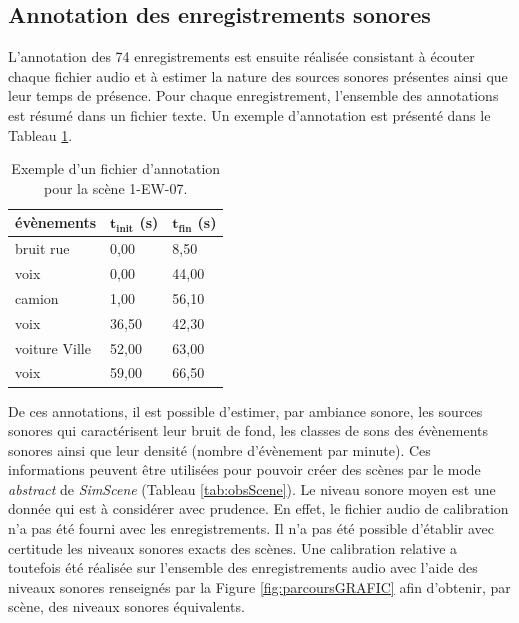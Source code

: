 \subsection{Annotation des enregistrements sonores}\label{part:scene_annotation}

L'annotation des 74 enregistrements est ensuite réalisée consistant à écouter chaque fichier audio et à estimer la nature des sources sonores présentes ainsi que leur temps de présence. Pour chaque enregistrement, l'ensemble des annotations est résumé dans un fichier texte. Un exemple d'annotation est présenté dans le Tableau \ref{tab:exemple_annotation}.\\

\begin{table}[h]
\caption{Exemple d'un fichier d'annotation pour la scène 1-EW-07.}
\centering
\begin{tabular}{lll}
\toprule
\textbf{évènements}    & $\mathbf{t_{init}}$ \textbf{(s)} & $\mathbf{t_{fin}}$ \textbf{(s)} \\ \midrule
bruit rue     & 0,00            & 8,50           \\
\rowcolor[HTML]{C0C0C0}
voix          & 0,00            & 44,00          \\
camion        & 1,00            & 56,10          \\
\rowcolor[HTML]{C0C0C0}
voix          & 36,50           & 42,30          \\
voiture Ville & 52,00          & 63,00          \\
\rowcolor[HTML]{C0C0C0}
voix          & 59,00           & 66,50         \\ \bottomrule
\end{tabular}
\label{tab:exemple_annotation}
\end{table}



De ces annotations, il est possible d'estimer, par ambiance sonore, les sources sonores qui caractérisent leur bruit de fond, les classes de sons des évènements sonores ainsi que leur densité (nombre d'évènement par minute). Ces informations peuvent être utilisées pour pouvoir créer des scènes par le mode \textit{abstract} de \textit{SimScene} (Tableau \ref{tab:obsScene}). Le niveau sonore moyen est une donnée qui est à considérer avec prudence. En effet, le fichier audio de calibration n'a pas été fourni avec les enregistrements. Il n'a pas été possible d'établir avec certitude les niveaux sonores exacts des scènes. Une calibration relative a toutefois été réalisée sur l'ensemble des enregistrements audio avec l'aide des niveaux sonores renseignés par la Figure \ref{fig:parcoursGRAFIC} afin d'obtenir, par scène, des niveaux sonores équivalents.\\

